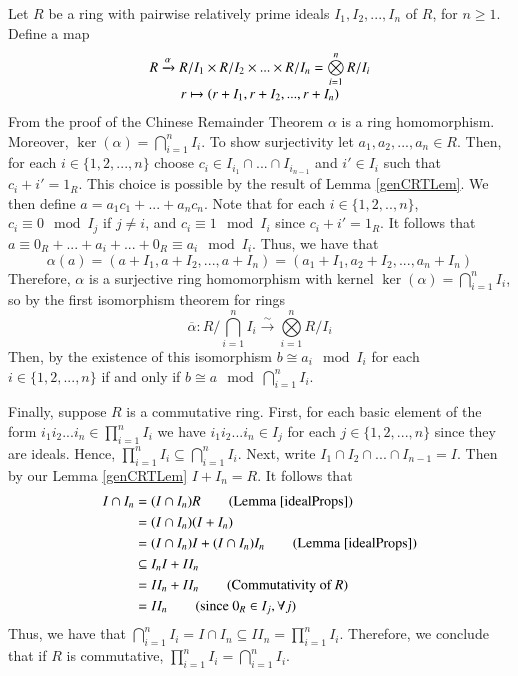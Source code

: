 \documentclass[12pt, a4paper, twoside, openright, titlepage]{book}
\begin{document}
\begin{proof*}{}{}
    Let $R$ be a ring with pairwise relatively prime ideals $I_1,I_2,...,I_n$ of $R$, for $n \geq 1$. Define a map $$\begin{array}{c} R\xrightarrow{\alpha} R/I_1 \times R/I_2 \times ... \times R/I_n = \bigotimes\limits_{i=1}^nR/I_i \\ r \mapsto (r+I_1, r+I_2,...,r+I_n) \end{array}$$
    From the proof of the Chinese Remainder Theorem $\alpha$ is a ring homomorphism. Moreover, $\ker(\alpha) = \bigcap\limits_{i=1}^nI_i$. To show surjectivity let $a_1,a_2,...,a_n \in R$. Then, for each $i \in \{1,2,...,n\}$ choose $c_i \in I_{i_1}\cap ... \cap I_{i_{n-1}}$ and $i' \in I_i$ such that $c_i + i' = 1_R$. This choice is possible by the result of Lemma \ref{genCRTLem}. We then define $a = a_1c_1 + ... + a_nc_n$. Note that for each $i \in \{1,2,..,n\}$, $c_i \equiv 0 \mod I_j$ if $j \neq i$, and $c_i \equiv 1 \mod I_i$ since $c_i + i' = 1_R$. It follows that $a \equiv 0_R + ... + a_i + ... + 0_R \equiv a_i \mod I_i$. Thus, we have that $$\alpha(a) = (a+I_1,a+I_2,...,a+I_n) = (a_1+I_1,a_2+I_2,...,a_n+I_n)$$ 
    Therefore, $\alpha$ is a surjective ring homomorphism with kernel $\ker(\alpha) = \bigcap\limits_{i=1}^nI_i$, so by the first isomorphism theorem for rings $$\overline{\alpha}: R/\bigcap\limits_{i=1}^n I_i \xrightarrow{\sim} \bigotimes\limits_{i=1}^nR/I_i$$
    Then, by the existence of this isomorphism $b \cong a_i \mod I_i$ for each $i \in \{1,2,...,n\}$ if and only if $b \cong a \mod \bigcap\limits_{i=1}^n I_i$. 
    
    
    Finally, suppose $R$ is a commutative ring. First, for each basic element of the form $i_1i_2...i_n \in \prod\limits_{i=1}^n I_i$ we have $i_1i_2...i_n \in I_j$ for each $j \in \{1,2,...,n\}$ since they are ideals. Hence, $\prod\limits_{i=1}^n I_i \subseteq \bigcap\limits_{i=1}^n I_i$. Next, write $I_1\cap I_2 \cap ... \cap I_{n-1} = I$. Then by our Lemma \ref{genCRTLem} $I + I_n = R$. It follows that \begin{align*}
        I \cap I_n &= (I \cap I_n)R \tag{Lemma \ref{idealProps}}\\
        &= (I\cap I_n)(I+I_n) \\
        &= (I\cap I_n)I + (I\cap I_n)I_n \tag{Lemma \ref{idealProps}} \\
        &\subseteq I_nI + II_n  \\
        &= II_n + II_n \tag{Commutativity of $R$} \\
        &= II_n \tag{since $0_R \in I_j, \forall j$} 
    \end{align*}
    Thus, we have that $\bigcap\limits_{i=1}^n I_i = I \cap I_n \subseteq II_n = \prod\limits_{i=1}^n I_i$. Therefore, we conclude that if $R$ is commutative, $\prod\limits_{i=1}^n I_i = \bigcap\limits_{i=1}^n I_i$.
\end{proof*}
\end{document}
